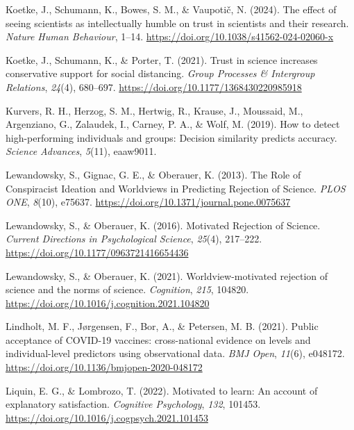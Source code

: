 \documentclass[
  jou,
  floatsintext,
  longtable,
  nolmodern,
  notxfonts,
  notimes,
  colorlinks=true,linkcolor=blue,citecolor=blue,urlcolor=blue]{apa7}
\newlength{\cslhangindent}
\newenvironment{CSLReferences}[2] %
 {\begin{list}{}{%
  \setlength{\itemindent}{0pt}
  \setlength{\leftmargin}{0pt}
  \setlength{\parsep}{0pt}
  \ifodd #1
   \setlength{\leftmargin}{\cslhangindent}
   \setlength{\itemindent}{-1\cslhangindent}
  \fi
  \setlength{\itemsep}{#2\baselineskip}}}
 {\end{list}}
\begin{document}
\begin{CSLReferences}{1}{0}
Koetke, J., Schumann, K., Bowes, S. M., \& Vaupotič, N. (2024). The
effect of seeing scientists as intellectually humble on trust in
scientists and their research. \emph{Nature Human Behaviour}, 1--14.
\url{https://doi.org/10.1038/s41562-024-02060-x}

Koetke, J., Schumann, K., \& Porter, T. (2021). Trust in science
increases conservative support for social distancing. \emph{Group
Processes \& Intergroup Relations}, \emph{24}(4), 680--697.
\url{https://doi.org/10.1177/1368430220985918}

Kurvers, R. H., Herzog, S. M., Hertwig, R., Krause, J., Moussaid, M.,
Argenziano, G., Zalaudek, I., Carney, P. A., \& Wolf, M. (2019). How to
detect high-performing individuals and groups: Decision similarity
predicts accuracy. \emph{Science Advances}, \emph{5}(11), eaaw9011.

Lewandowsky, S., Gignac, G. E., \& Oberauer, K. (2013). The Role of
Conspiracist Ideation and Worldviews in Predicting Rejection of Science.
\emph{PLOS ONE}, \emph{8}(10), e75637.
\url{https://doi.org/10.1371/journal.pone.0075637}

Lewandowsky, S., \& Oberauer, K. (2016). Motivated Rejection of Science.
\emph{Current Directions in Psychological Science}, \emph{25}(4),
217--222. \url{https://doi.org/10.1177/0963721416654436}

Lewandowsky, S., \& Oberauer, K. (2021). Worldview-motivated rejection
of science and the norms of science. \emph{Cognition}, \emph{215},
104820. \url{https://doi.org/10.1016/j.cognition.2021.104820}

Lindholt, M. F., Jørgensen, F., Bor, A., \& Petersen, M. B. (2021).
Public acceptance of COVID-19 vaccines: cross-national evidence on
levels and individual-level predictors using observational data.
\emph{BMJ Open}, \emph{11}(6), e048172.
\url{https://doi.org/10.1136/bmjopen-2020-048172}

Liquin, E. G., \& Lombrozo, T. (2022). Motivated to learn: An account of
explanatory satisfaction. \emph{Cognitive Psychology}, \emph{132},
101453. \url{https://doi.org/10.1016/j.cogpsych.2021.101453}


\end{CSLReferences}
\end{document}
